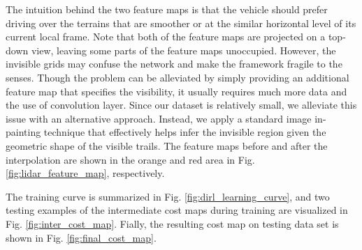 \documentclass[../thesis.tex]{subfiles}
\begin{document}
The intuition behind the two feature maps is that the vehicle should prefer driving over the terrains that are smoother or at the similar horizontal level of its current local frame.
Note that both of the feature maps are projected on a top-down view, leaving some parts of the feature maps unoccupied. 
However, the invisible grids may confuse the network and make the framework fragile to the senses. 
Though the problem can be alleviated by simply providing an additional feature map that specifies the visibility, it usually requires much more data and the use of convolution layer. \cite{wulfmeier2015maximum,wulfmeier2016watch}
Since our dataset is relatively small, we alleviate this issue with an alternative approach. 
Instead, we apply a standard image in-painting technique \cite{telea2004image} that effectively helps infer the invisible region given the geometric shape of the visible trails. 
The feature maps before and after the interpolation are shown in the orange and red area in Fig. \ref{fig:lidar_feature_map}, respectively.

The training curve is summarized in Fig. \ref{fig:dirl_learning_curve}, and two testing examples of the intermediate cost maps during training are visualized in Fig. \ref{fig:inter_cost_map}. Fially, the resulting cost map on testing data set is shown in Fig. \ref{fig:final_cost_map}.
\end{document}
